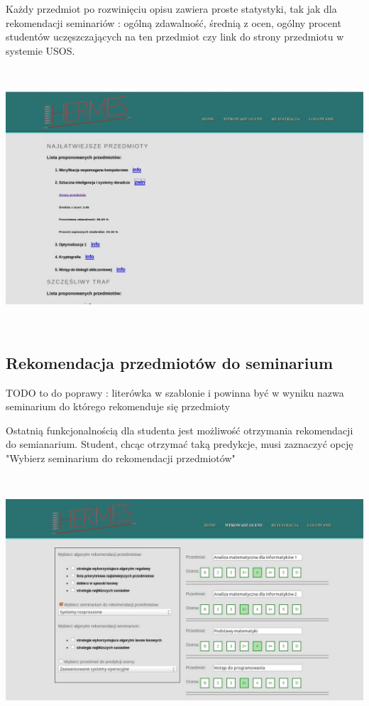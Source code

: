\documentclass[licencjacka]{pracamgr}
\begin{document}
Każdy przedmiot po rozwinięciu opisu zawiera proste statystyki, tak jak dla rekomendacji seminariów : ogólną zdawalność, średnią z ocen, ogólny procent studentów uczęszczających na ten przedmiot czy link do strony przedmiotu w systemie USOS. \par
 ~\\
\begin{minipage}{\linewidth}
	\centering
           \includegraphics[scale=0.5]{rekPrzedmRankDetails.jpg}
\end{minipage} \\ 

\subsection{Rekomendacja przedmiotów do seminarium}

TODO to do poprawy : literówka w szablonie i powinna być w wyniku nazwa seminarium do którego rekomenduje się przedmioty

Ostatnią funkcjonalnością dla studenta jest możliwość otrzymania rekomendacji do semianarium. Student, chcąc otrzymać taką predykcje, musi zaznaczyć opcję "Wybierz seminarium do rekomendacji przedmiotów" \par
~\\
\begin{minipage}{\linewidth}
	\centering
           \includegraphics[scale=0.5]{rekPrzedmSem.jpg}
\end{minipage} \\
\end{document}
